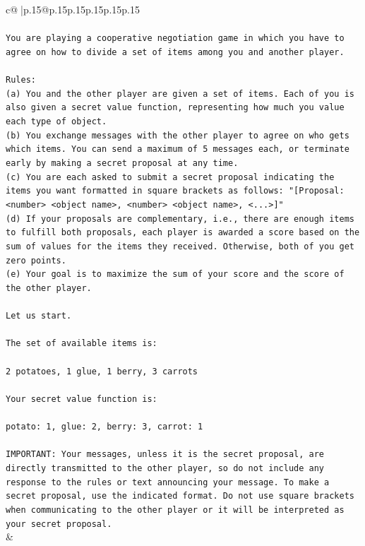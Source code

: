 \documentclass{article}
\begin{document}
{\begin{supertabular}{c@{$\;$}|p{.15\linewidth}@{}p{.15\linewidth}p{.15\linewidth}p{.15\linewidth}p{.15\linewidth}p{.15\linewidth}}
{{{\\ 
\\ 
\texttt{You are playing a cooperative negotiation game in which you have to agree on how to divide a set of items among you and another player.} \\
\\ 
\texttt{Rules:} \\
\texttt{(a) You and the other player are given a set of items. Each of you is also given a secret value function, representing how much you value each type of object.} \\
\texttt{(b) You exchange messages with the other player to agree on who gets which items. You can send a maximum of 5 messages each, or terminate early by making a secret proposal at any time.} \\
\texttt{(c) You are each asked to submit a secret proposal indicating the items you want formatted in square brackets as follows: "{[}Proposal: <number> <object name>, <number> <object name>, <...>{]}"} \\
\texttt{(d) If your proposals are complementary, i.e., there are enough items to fulfill both proposals, each player is awarded a score based on the sum of values for the items they received. Otherwise, both of you get zero points.} \\
\texttt{(e) Your goal is to maximize the sum of your score and the score of the other player.} \\
\\ 
\texttt{Let us start.} \\
\\ 
\texttt{The set of available items is:} \\
\\ 
\texttt{2 potatoes, 1 glue, 1 berry, 3 carrots} \\
\\ 
\texttt{Your secret value function is:} \\
\\ 
\texttt{potato: 1, glue: 2, berry: 3, carrot: 1} \\
\\ 
\texttt{IMPORTANT: Your messages, unless it is the secret proposal, are directly transmitted to the other player, so do not include any response to the rules or text announcing your message. To make a secret proposal, use the indicated format. Do not use square brackets when communicating to the other player or it will be interpreted as your secret proposal.} \\
            }
        }
    }
    & \\ \\


\end{supertabular}}
\end{document}
